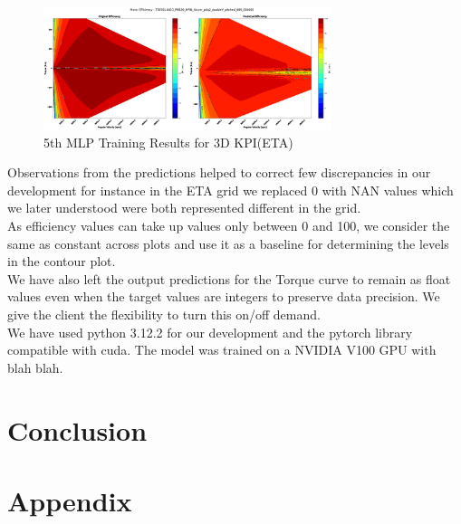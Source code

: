 \documentclass{report} %
\begin{document}
\begin{figure}[h]
    \centering
    \includegraphics[width=0.75\textwidth]{./ReportImages/KPI3Dprediction5.png} 
    \caption{5th MLP Training Results for 3D KPI(ETA)} 
    \label{fig:5th MLP Training Results for 3D KPI(ETA)}
\end{figure}

Observations from the predictions helped to correct few discrepancies in our development for instance in the ETA grid we replaced 0 with NAN values which we later understood were both represented different in the grid.\\
As efficiency values can take up values only between 0 and 100, we consider the same as constant across plots and use it as a baseline for determining the levels in the contour plot. \\ 
We have also left the output predictions for the Torque curve to remain as float values even when the target values are integers to preserve data precision. We give the client the flexibility to turn this on/off demand. \\
We have used python 3.12.2 for our development and the pytorch library compatible with cuda.
The model was trained on a NVIDIA V100 GPU with blah blah.\\

\newpage 

\chapter*{Conclusion}

\newpage 

\newpage 

\listoffigures

\newpage 

\newpage 

\listoftables

\newpage 

\newpage 

\chapter*{Appendix}
\end{document}
